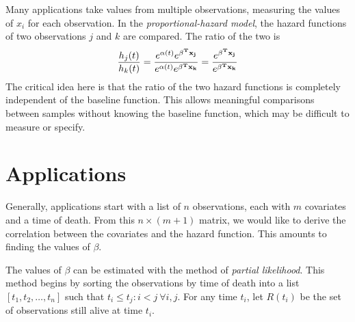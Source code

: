 Many applications take values from multiple observations, measuring the values of $x_i$ for each observation.  %
In the \textit{proportional-hazard model}, the hazard functions of two observations $j$ and $k$ are compared.  The ratio of the two is
\begin{equation}
\frac{h_j(t)}{h_k(t)} = \frac{e^{\alpha(t)} e^{\bold{\beta^T x_j}} }{e^{\alpha(t)} e^{\bold{\beta^T x_k}} } = \frac{e^{\bold{\beta^T x_j} }}{ e^{\bold{\beta^T x_k}}}
\end{equation}
The critical idea here is that the ratio of the two hazard functions is completely independent of the baseline function.  This allows meaningful comparisons between samples without knowing the baseline function, which may be difficult to measure or specify.

\section{Applications}\label{cox:Application}
Generally, applications start with a list of $n$ observations, each with $m$ covariates and a time of death.  From this $n \times (m+1)$ matrix, we would like to derive the correlation between the covariates and the hazard function.  This amounts to finding the values of  $\beta$.  

The values of $\beta$ can be estimated with the method of \textit{partial likelihood}.  This method begins by sorting the observations by time of death into a list $[t_1, t_2, \dots, t_n]$ such that $t_i \le t_j : i < j\ \forall i,j$.  For any time $t_i$, let $R(t_i)$ be the set of observations still alive at time $t_i$.  

